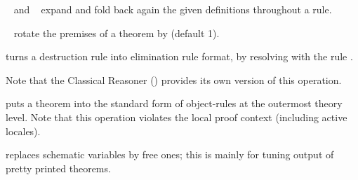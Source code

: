 \begin{isabellebody}
\begin{isamarkuptext}
\begin{description}
  \item \hyperlink{attribute.unfolded}{\mbox{}}~ and \hyperlink{attribute.folded}{\mbox{}}~ expand and fold back again the given
  definitions throughout a rule.

  \item \hyperlink{attribute.rotated}{\mbox{}}~ rotate the premises of a
  theorem by  (default 1).

  \item \hyperlink{attribute.Pure.elim-format}{\mbox{}} turns a destruction rule into
  elimination rule format, by resolving with the rule .
  
  Note that the Classical Reasoner () provides
  its own version of this operation.

  \item \hyperlink{attribute.standard}{\mbox{}} puts a theorem into the standard form of
  object-rules at the outermost theory level.  Note that this
  operation violates the local proof context (including active
  locales).

  \item \hyperlink{attribute.no-vars}{\mbox{}} replaces schematic variables by free
  ones; this is mainly for tuning output of pretty printed theorems.


\end{description}
\end{isamarkuptext}
\end{isabellebody}
